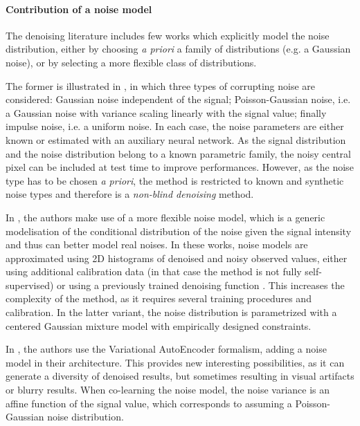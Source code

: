 \documentclass[lettersize,journal]{IEEEtran}
\begin{document}
\paragraph{Contribution of a noise model}
The denoising literature includes few works which explicitly model the noise distribution, either by choosing \textit{a priori} a  family of distributions (e.g. a Gaussian noise), or by selecting a more flexible class of distributions.

The former is illustrated in \cite{laine2019high}, in which three types of corrupting noise are considered: Gaussian noise independent of the signal; Poisson-Gaussian noise, i.e. a Gaussian noise with variance scaling linearly with the signal value; finally impulse noise, i.e. a uniform noise. In each case, the noise parameters are either known or estimated with an auxiliary neural network. As the signal distribution and the noise distribution belong to a known parametric family, the noisy central pixel can be included at test time to improve performances. However, as the noise type has to be chosen \textit{a priori}, the method is restricted to known and synthetic noise types and therefore is a \textit{non-blind denoising} method.

In \cite{krull2019probabilistic,prakash2020fully}, the authors make use of a more flexible noise model, which is a generic modelisation of the conditional distribution of the noise given the signal intensity and thus can better model real noises.
In these works, noise models are approximated using 2D histograms of denoised and noisy observed values, either using additional calibration data (in that case the method is not fully self-supervised) or using a previously trained denoising function \cite{prakash2020fully}. This increases the complexity of the method, as it requires several training procedures and calibration.
In the latter variant, the noise distribution is parametrized with a centered Gaussian mixture model with empirically designed constraints.

In \cite{2020DivNoising}, the authors use the Variational Auto\-Encoder formalism, adding a noise model in their architecture.
This provides new interesting possibilities, as it can generate a diversity of denoised results, but sometimes resulting in visual artifacts or blurry results. When co-learning the noise model, the noise variance is an affine function of the signal value, which corresponds to assuming a Poisson-Gaussian noise distribution.
\end{document}
